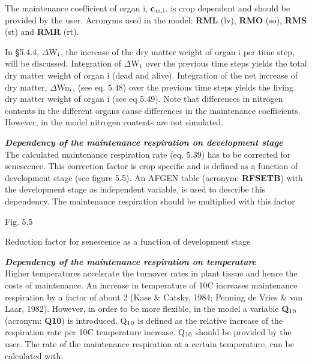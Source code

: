 \documentclass[11pt]{article}
\newcommand{\FigDir}{.}
\begin{document}
 \bigskip
The maintenance coefficient of organ i, {\bf c$_{{\rm m,i}}$}, is crop dependent and should be provided by
the user. Acronyms used in the model: {\bf RML} (lv), {\bf RMO} (so), {\bf RMS} (st) and {\bf RMR} (rt).

In \S 5.4.4, $\Delta$W$_{{\rm i}}$, the increase of the dry matter weight of organ i per time step, will be
discussed. Integration of $\Delta$W$_{{\rm i}}$ over the previous time steps yields the total dry matter
weight of organ i (dead and alive). Integration of the net increase of dry matter, $\Delta$Wn$_{{\rm i}}$,
(see eq. 5.48) over the previous time steps yields the living dry matter weight of organ i
(see eq 5.49). Note that differences in nitrogen contents in the different organs cause
differ\-enc\-es in the mainte\-nance coefficients. However, in the model nitrogen contents are
not simulated.

\bigskip
\bigskip
{\bf {\it Dependency of the maintenance respiration on development stage\/}}\\
The calculated maintenance respiration rate (eq. 5.39) has to be corrected for senescence.
This correction factor is crop specific and is defined as a function of development stage
(see figure 5.5). An AFGEN table (acronym: {\bf RFSETB}) with the development stage as
independent variable, is used to describe this dependency. The maintenance respiration
should be multiplied with this factor\\
\begin{figure}[htbp]
\begin{forcewidth}{8.44cm}
 \begin{center}\InputPS{\FigDir/RFSETB.eps} \end{center}
\end{forcewidth}
\end{figure}

\bigskip
\bigskip
\bigskip
\bigskip
\bigskip
\bigskip
\bigskip
\bigskip
\bigskip
\bigskip
\bigskip
\bigskip
\bigskip
Fig. 5.5
\testlastline

\begin{indenting}{2.54cm}
Reduc\-tion factor for senescence as a function of development stage
\end{indenting}
 {\bf {\it Dependency of the maintenance respiration on temperature\/}}\\
Higher temperatures accelerate the turnover rates in plant tissue and hence the costs of
mainten\-ance. An increase in temperature of 10\degrees C increases maintenance respira\-tion by a
factor of about 2 (Kase \& Catsky, 1984; Penning de Vries \& van Laar, 1982). However,
in order to be more flexible, in the model a variable {\bf Q$_{{\rm 10}}$} (acronym: {\bf Q10}) is introduced.
Q$_{{\rm 10}}$ is defined as the relative increase of the respiration rate per 10\degrees C temperature
increase. Q$_{{\rm 10}}$ should be provided by the user. The rate of the maintenance respiration at a
certain temperature, can be calculated with:
\end{document}
